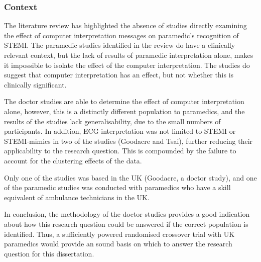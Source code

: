 \subsubsection{Context}
\label{context}

The literature review has highlighted the absence of studies directly examining the effect of computer interpretation messages on paramedic's recognition of STEMI. The paramedic studies identified in the review do have a clinically relevant context, but the lack of results of paramedic interpretation alone, makes it impossible to isolate the effect of the computer interpretation. The studies do suggest that computer interpretation has an effect, but not whether this is clinically significant.

The doctor studies are able to determine the effect of computer interpretation alone, however, this is a distinctly different population to paramedics, and the results of the studies lack generalisability, due to the small numbers of participants. In addition, ECG interpretation was not limited to STEMI or STEMI-mimics in two of the studies (Goodacre and Tsai), further reducing their applicability to the research question. This is compounded by the failure to account for the clustering effects of the data.

Only one of the studies was based in the UK (Goodacre, a doctor study), and one of the paramedic studies was conducted with paramedics who have a skill equivalent of ambulance technicians in the UK.

In conclusion, the methodology of the doctor studies provides a good indication about how this research question could be answered if the correct population is identified. Thus, a sufficiently powered randomised crossover trial with UK paramedics would provide an sound basis on which to answer the research question for this dissertation.
